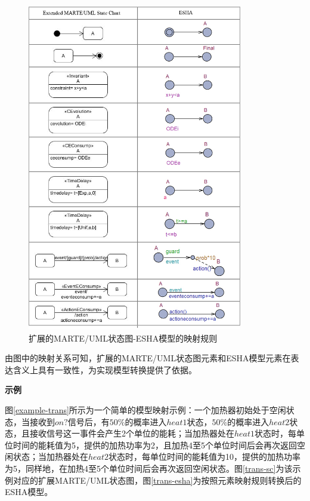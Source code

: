 	\begin{figure}[!b]
	\centering
	\includegraphics[width=3.7in]{mapping(new).jpg}
	\caption{扩展的MARTE/UML状态图-ESHA模型的映射规则}
	\label{SC2ESHA}
	\end{figure}
	
	由图中的映射关系可知，扩展的MARTE/UML状态图元素和ESHA模型元素在表达含义上具有一致性，为实现模型转换提供了依据。
	
	\textbf{示例}
	
	图\ref{example-trans}所示为一个简单的模型映射示例：一个加热器初始处于空闲状态，当接收到$on?$信号后，有$50\%$的概率进入$heat1$状态，$50\%$的概率进入$heat2$状态，且接收信号这一事件会产生2个单位的能耗；当加热器处在$heat1$状态时，每单位时间的能耗值为5，提供的加热功率为2，且加热4至5个单位时间后会再次返回空闲状态；当加热器处在$heat2$状态时，每单位时间的能耗值为10，提供的加热功率为5，同样地，在加热4至5个单位时间后会再次返回空闲状态。图\ref{trans-sc}为该示例对应的扩展MARTE/UML状态图，图\ref{trans-esha}为按照元素映射规则转换后的ESHA模型。
	
